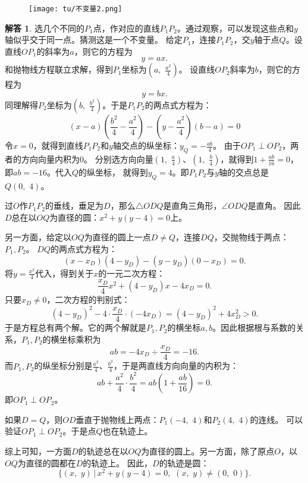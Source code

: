 \documentclass[12pt,UTF8]{ctexbook}
\theoremstyle{definition}
\newtheorem*{so}{解答}
\theoremstyle{plain}
\begin{document}
\begin{figure}[H] %
    \vspace{4pt}
    \centering
    \texttt{[image: tu/不变量2.png]}
\end{figure}

\begin{so}
    选几个不同的$P_1$点，作对应的直线$P_1P_2$。通过观察，可以发现这些点和$y$轴似乎交于同一点。猜测这是一个不变量。
    给定$P_1$，连接$P_1P_2$，交$y$轴于点$Q$。设直线$OP_1$的斜率为$a$，则它的方程为
    $$ y = ax. $$
    和抛物线方程联立求解，得到$P_1$坐标为$(a, \,\, \frac{a^2}{4})$。
    设直线$OP_2$斜率为$b$，则它的方程为
    $$ y = bx. $$
    同理解得$P_2$坐标为$(b, \,\, \frac{b^2}{4})$。于是$P_1P_2$的两点式方程为：
    $$ (x - a)\left(\frac{b^2}{4} - \frac{a^2}{4}\right) - \left(y - \frac{a^2}{4}\right)(b - a) = 0$$
    令$x=0$，就得到直线$P_1P_2$和$y$轴交点的纵坐标：$y_Q = -\frac{ab}{4}$。
    由于$OP_1 \perp OP_2$，两者的方向向量内积为$0$。
    分别选方向向量$(1,\,\,\frac{a}{4})$、$(1,\,\,\frac{b}{4})$，就得到$1 + \frac{ab}{16} = 0$，即$ab = -16$。代入$Q$的纵坐标，
    就得到$y_Q = 4$。即$P_1P_2$与$y$轴的交点总是$Q(0,\,\,4)$。

    过$O$作$P_1P_2$的垂线，垂足为$D$，那么$\triangle ODQ$是直角三角形，$\angle ODQ$是直角。
    因此$D$总在以$OQ$为直径的圆：$x^2 + y(y-4) = 0$上。

    另一方面，给定以$OQ$为直径的圆上一点$D\neq Q$，连接$DQ$，交抛物线于两点：$P_1,P_2$。
    $DQ$的两点式方程为：
    $$ (x - x_D)(4 - y_D) - (y - y_D)(0 - x_D) = 0.$$
    将$y = \frac{x^2}{4}$代入，得到关于$x$的一元二次方程：
    $$ \frac{x_D}{4}x^2 + \left(4 - y_D\right)x - 4x_D = 0.$$
    只要$x_D\neq 0$，二次方程的判别式：
    $$ (4 - y_D)^2 - 4\cdot \frac{x_D}{4}\cdot(- 4x_D) = (4 - y_D)^2 + 4x_D^2 > 0.$$
    于是方程总有两个解。它的两个解就是$P_1,P_2$的横坐标$a,b$。因此根据根与系数的关系，$P_1,P_2$的横坐标乘积为
    $$ab = -4x_D \div \frac{x_D}{4} = -16.$$
    而$P_1,P_2$的纵坐标分别是$\frac{a^2}{4}$、$\frac{b^2}{4}$，于是两直线方向向量的内积为：
    $$ ab + \frac{a^2}{4}\cdot\frac{b^2}{4} = ab(1 + \frac{ab}{16}) = 0.$$
    即$OP_1 \perp OP_2$。
    
    如果$D=Q$，则$OD$垂直于抛物线上两点：$P_1(-4,\,\,4)$和$P_2(4,\,\,4)$的连线。
    可以验证$OP_1\perp OP_2$。于是点$Q$也在轨迹上。
    
    综上可知，一方面$D$的轨迹总在以$OQ$为直径的圆上。另一方面，除了原点$O$，以$OQ$为直径的圆都在$D$的轨迹上。
    因此，$D$的轨迹是圆：
    $$\{(x,\,\,y) \, | \, x^2 + y(y-4) = 0, \,\, (x,\,\,y)\neq (0,\,\,0)\}.$$
\end{so}
\end{document}
